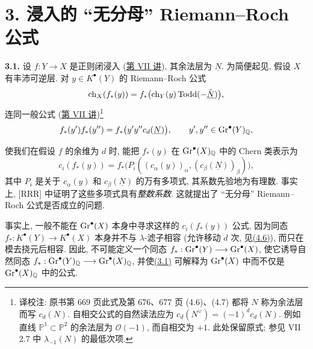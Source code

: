 \section*{3. 浸入的 ``无分母'' Riemann--Roch 公式}

\textbf{3.1.} 设 $f:Y\to X$ 是正则闭浸入 (\hyperlink{sga6.e07.expose}{第 VII 讲}), 其余法层为 $\underline N$. 为简便起见, 假设 $X$ 有丰沛可逆层. 对 $y\in K^\bullet(Y)$ 的 Riemann--Roch 公式
\[
  \operatorname{ch}_X(f_*(y))
  =f_*\bigl(\operatorname{ch}_Y(y)\operatorname{Todd}(-\check{\underline N})\bigr),
\]
连同一般公式 (\hyperlink{sga6.e07.expose}{第 VII 讲})\footnote{译校注: 原书第 669 页此式及第 676、677 页 (4.6)、(4.7) 都将 \(N\) 称为余法层而写 \(c_d(N)\). 自相交公式的自然读法应为 \(c_d(N^\vee)=(-1)^dc_d(N)\). 例如直线 \(\mathbb P^1\subset\mathbb P^2\) 的余法层为 \(\mathcal O(-1)\), 而自相交为 \(+1\). 此处保留原式; 参见 VII 2.7 中 \(\lambda_{-1}(N)\) 的最低次项.}
\[
  f_*(y')f_*(y'')
  =f_*\bigl(y'y''c_d(\underline N)\bigr),
  \qquad y',y''\in\operatorname{Gr}^\bullet(Y)_{\mathbb Q},
\]

使我们在假设 $f$ 的余维为 $d$ 时, 能把 $f_*(y)$ 在 $\operatorname{Gr}^\bullet(X)_{\mathbb Q}$ 中的 Chern 类表示为
\begin{equation}\tag{3.1}
  c_i(f_*(y))
  =f_*\bigl(P_i((c_\alpha(y))_\alpha,(c_\beta(\underline N))_\beta)\bigr),
\end{equation}
其中 $P_i$ 是关于 $c_\alpha(y)$ 和 $c_\beta(\underline N)$ 的万有多项式, 其系数先验地为有理数. 事实上, [RRR] 中证明了这些多项式具有\emph{整数系数}. 这就提出了 ``无分母'' Riemann--Roch 公式是否成立的问题.

事实上, 一般不能在 $\operatorname{Gr}^\bullet(X)$ 本身中寻求这样的 $c_i(f_*(y))$ 公式, 因为同态 $f_*:K^\bullet(Y)\longrightarrow K^\bullet(X)$ 本身并不与 $\lambda$-滤子相容 (允许移动 $d$ 次, 见\hyperlink{sga6.e14.para.4-6}{(4.6)}), 而只在模去挠元后相容. 因此, 不可能定义一个同态 $f_*:\operatorname{Gr}^\bullet(Y)\longrightarrow\operatorname{Gr}^\bullet(X)$, 使它诱导自然同态 $f_*:\operatorname{Gr}^\bullet(Y)_{\mathbb Q}\longrightarrow\operatorname{Gr}^\bullet(X)_{\mathbb Q}$, 并使\hyperlink{sga6.e14.eq.3-1}{(3.1)} 可解释为 $\operatorname{Gr}^\bullet(X)$ 中而不仅是 $\operatorname{Gr}^\bullet(X)_{\mathbb Q}$ 中的公式.

